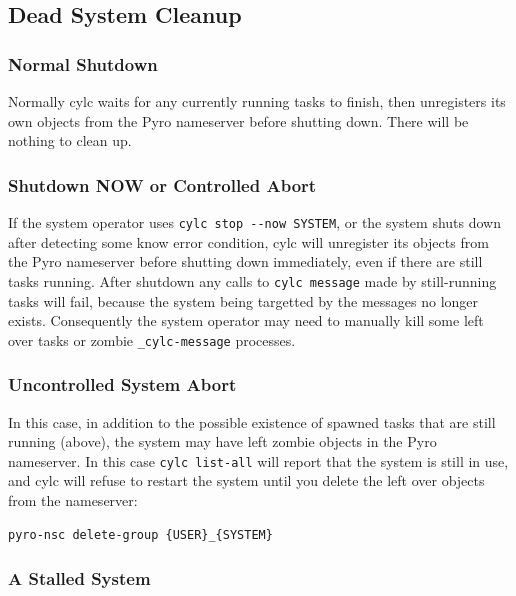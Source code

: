 \documentclass[11pt,a4paper]{article}
\begin{document}
\subsection{Dead System Cleanup}
\label{DeadSystemCleanup}

\subsubsection{Normal Shutdown}

Normally cylc waits for any currently running tasks to finish, then
unregisters its own objects from the Pyro nameserver before shutting
down. There will be nothing to clean up. 

\subsubsection{Shutdown NOW or Controlled Abort}

If the system operator uses \lstinline=cylc stop --now SYSTEM=, or the
system shuts down after detecting some know error condition, cylc will
unregister its objects from the Pyro nameserver before shutting down
immediately, even if there are still tasks running. After shutdown any
calls to \lstinline=cylc message= made by still-running tasks will
fail, because the system being targetted by the messages no longer
exists.  Consequently the system operator may need to manually kill some
left over tasks or zombie \lstinline=_cylc-message= processes. 

\subsubsection{Uncontrolled System Abort}

In this case, in addition to the possible existence of spawned tasks
that are still running (above), the system may have left zombie objects
in the Pyro nameserver. In this case \lstinline=cylc list-all= will
report that the system is still in use, and cylc will refuse to restart
the system until you delete the left over objects from the nameserver:

\begin{lstlisting}
pyro-nsc delete-group {USER}_{SYSTEM}
\end{lstlisting}

\subsubsection{A Stalled System}
\end{document}
